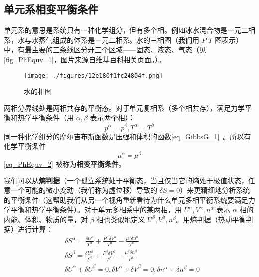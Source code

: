 \subsection{单元系相变平衡条件}
单元系的意思是系统只有一种化学组分，但有多个相。例如冰水混合物是一元二相系，水与水蒸气组成的体系是一元二相系。水的三相图（我们用 $P$-$T$ 图表示）中，有最主要的三条线区分开三个区域——固态、液态、气态（见\autoref{fig_PhEquv_1}，图片来源自维基百科\href{https://en.wikipedia.org/wiki/Triple_point}{相关页面}。）。
\begin{figure}[ht]
\centering
\texttt{[image: ./figures/12e180f1fc24804f.png]}
\caption{水的相图} \label{fig_PhEquv_1}
\end{figure}

两相分界线处是两相共存的平衡态。对于单元复相系（多个相共存），满足力学平衡和热学平衡条件（用 $\alpha,\beta$ 表示两个相）：
\begin{equation}\label{eq_PhEquv_1}
p^{\alpha}=p^{\beta}, 
T^{\alpha}=T^{\beta}
\end{equation}
同一种化学组分的摩尔吉布斯函数是压强和体积的函数\autoref{eq_GibbsG_1}~。所以有化学平衡条件
\begin{equation}\label{eq_PhEquv_2}
\mu^{\alpha}=\mu^\beta
\end{equation}
\autoref{eq_PhEquv_2} 被称为\textbf{相变平衡条件}。

我们可以从\textbf{熵判据}（一个孤立系统处于平衡态，当且仅当它的熵处于极值状态，任意一个可能的微小变动（我们称为虚位移）导致的 $\delta S=0$）来更精细地分析系统的平衡条件（这帮助我们从另一个视角重新看待为什么单元多相平衡系统要满足力学平衡和热学平衡条件）。对于单元多相系中的某两相，用 $U^\alpha,V^\alpha,n^\alpha$ 表示 $\alpha$ 相的内能、体积、物质的量，对 $\beta$ 相也类似地定义 $U^\beta,V^\beta,n^\beta$。用熵判据（热动平衡判据）进行计算：
\begin{equation}
\begin{aligned}
&\delta S^\alpha=\frac{\delta U^\alpha}{T^\alpha}+\frac{P^\alpha\delta V^\alpha}{T^{\alpha}}-\frac{\mu^\alpha\delta n^\alpha}{T^{\alpha}}\\
&\delta S^\beta=\frac{\delta U^\beta}{T^\beta}+\frac{P^\beta\delta V^\beta}{T^{\beta}}-\frac{\mu^\beta\delta n^\beta}{T^{\beta}}\\
&\delta U^\alpha+\delta U^\beta=0,\delta V^\alpha+\delta V^\beta=0,\delta n^\alpha+\delta n^\beta=0
\end{aligned}
\end{equation}

